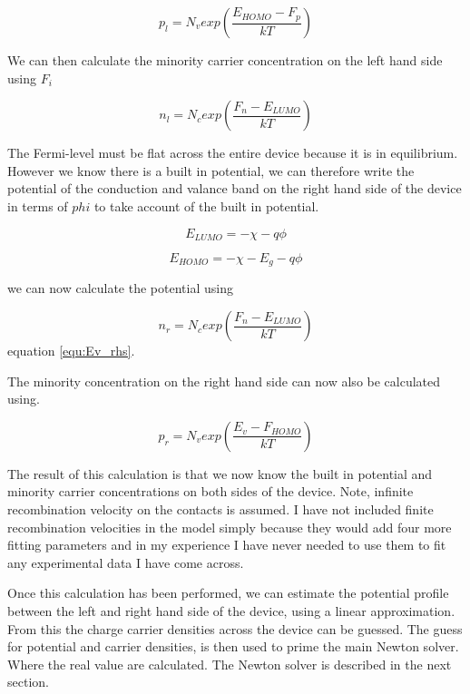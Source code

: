 \documentclass[11pt]{article}
\begin{document}
\begin{equation}
p_{l}=N_v exp \left(\frac{E_{HOMO}-F_p}{kT} \right)
\end{equation}

We can then calculate the minority carrier concentration on the left hand side using $F_i$

\begin{equation}
n_{l}=N_c exp \left (\frac{F_n-E_{LUMO}}{kT} \right)
\end{equation}

The Fermi-level must be flat across the entire device because it is in equilibrium.  However we know there is a built in potential, we can therefore write the potential of the conduction and valance band on the right hand side of the device in terms of $phi$ to take account of the built in potential.

\begin{equation}
E_{LUMO}=-\chi-q\phi
\label{equ:Ev_rhs}
\end{equation}

\begin{equation}
E_{HOMO}=-\chi-E_g-q\phi
\end{equation}

we can now calculate the potential using

\begin{equation}
n_{r}=N_c exp \left (\frac{F_n-E_{LUMO}}{kT} \right)
\end{equation}
equation \ref{equ:Ev_rhs}.

The minority concentration on the right hand side can now also be calculated using.

\begin{equation}
p_{r}=N_v exp \left (\frac{E_v-F_{HOMO}}{kT} \right)
\end{equation}

The result of this calculation is that we now know the built in potential and minority carrier concentrations on both sides of the device.  Note, infinite recombination velocity on the contacts is assumed.  I have not included finite recombination velocities in the model simply because they would add four more fitting parameters and in my experience I have never needed to use them to fit any experimental data I have come across.

Once this calculation has been performed, we can estimate the potential profile between the left and right hand side of the device, using a linear approximation. From this the charge carrier densities across the device can be guessed.  The guess for potential and carrier densities, is then used to prime the main Newton solver.  Where the real value are calculated.  The Newton solver is described in the next section.
\end{document}
